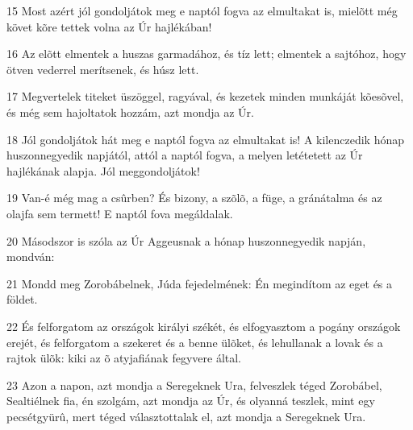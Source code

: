 \par 15 Most azért jól gondoljátok meg e naptól fogva az elmultakat is, mielõtt még követ kõre tettek volna az Úr hajlékában!
\par 16 Az elõtt elmentek a huszas garmadához, és tíz lett; elmentek a sajtóhoz, hogy ötven vederrel merítsenek, és húsz lett.
\par 17 Megvertelek titeket üszöggel, ragyával, és kezetek minden munkáját kõesõvel, és még sem hajoltatok hozzám, azt mondja az Úr.
\par 18 Jól gondoljátok hát meg e naptól fogva az elmultakat is! A kilenczedik hónap huszonnegyedik napjától, attól a naptól fogva, a melyen letétetett az Úr hajlékának alapja. Jól meggondoljátok!
\par 19 Van-é még mag a csûrben? És bizony, a szõlõ, a füge, a gránátalma és az olajfa sem termett! E naptól fova megáldalak.
\par 20 Másodszor is szóla az Úr Aggeusnak a hónap huszonnegyedik napján, mondván:
\par 21 Mondd meg Zorobábelnek, Júda fejedelmének: Én megindítom az eget és a földet.
\par 22 És felforgatom az országok királyi székét, és elfogyasztom a pogány országok erejét, és felforgatom a szekeret és a benne ülõket, és lehullanak a lovak és a rajtok ülõk: kiki az õ atyjafiának fegyvere által.
\par 23 Azon a napon, azt mondja a Seregeknek Ura, felveszlek téged Zorobábel, Sealtiélnek fia, én szolgám, azt mondja az Úr, és olyanná teszlek, mint egy pecsétgyürû, mert téged választottalak el, azt mondja a Seregeknek Ura.


